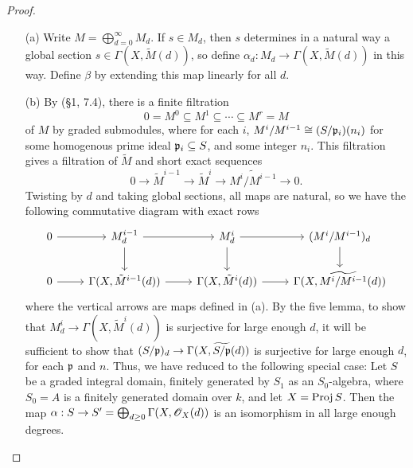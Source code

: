 \documentclass{article}
\begin{document}
\begin{enumerate} [label=\textbf{\arabic*.}, leftmargin=0em]
\begin{proof} $ $ \vspace{0pt}
    \begin{itemize} [leftmargin=0cm]
        \item[(a)] Write $M = \bigoplus_{d = 0}^\infty M_d$. If $s \in M_d$, then $s$ determines in a natural way a global section $s \in \Gamma(X, \tilde{M}(d))$, so define $\alpha_d : M_d \to \Gamma(X, \tilde{M}(d))$ in this way. Define $\beta$ by extending this map linearly for all $d$.

        \item[(b)] By (\S 1, 7.4), there is a finite filtration
        \begin{equation*}
            0 = M^0 \subseteq M^1 \subseteq \cdots \subseteq M^r = M
        \end{equation*}
        of $M$ by graded submodules, where for each $i$, $M^i / M^{i - 1} \cong (S / \mathfrak{p}_i)(n_i)$ for some homogenous prime ideal $\mathfrak{p}_i \subseteq S$, and some integer $n_i$. This filtration gives a filtration of $\tilde{M}$ and short exact sequences
        \begin{equation*}
            0 \to \tilde{M}^{i - 1} \to \tilde{M}^i \to \widetilde{M^i / M^{i - 1}} \to 0.
        \end{equation*}
        Twisting by $d$ and taking global sections, all maps are natural, so we have the following commutative diagram with exact rows
        \[ \begin{tikzcd}
            0 \arrow[r] & M_d^{i-1} \arrow[d] \arrow[r]         & M_d^i \arrow[d] \arrow[r]         & (M^i/M^{i-1})_d \arrow[d]             \\
            0 \arrow[r] & \Gamma(X, \tilde{M}^{i-1}(d)) \arrow[r] & \Gamma(X,\tilde{M}^i(d)) \arrow[r] & \Gamma(X, \widetilde{M^i/M^{i-1}}(d))
            \end{tikzcd} \]
        where the vertical arrows are maps defined in (a). By the five lemma, to show that $M_d^i \to \Gamma(X, \tilde{M}^i(d))$ is surjective for large enough $d$, it will be sufficient to show that $(S/\mathfrak{p})_d \to \Gamma(X, \widetilde{S/\mathfrak{p}}(d))$ is surjective for large enough $d$, for each $\mathfrak{p}$ and $n$.  Thus, we have reduced to the following special case: Let $S$ be a graded integral domain, finitely generated by $S_1$ as an $S_0$-algebra, where $S_0 = A$ is a finitely generated domain over $k$, and let $X = \operatorname{Proj}{S}$. Then the map $\alpha : S \to S' = \bigoplus_{d \geq 0} \Gamma(X, \mathscr{O}_X(d))$ is an isomorphism in all large enough degrees.


\end{itemize}
\end{proof}
\end{enumerate}
\end{document}
